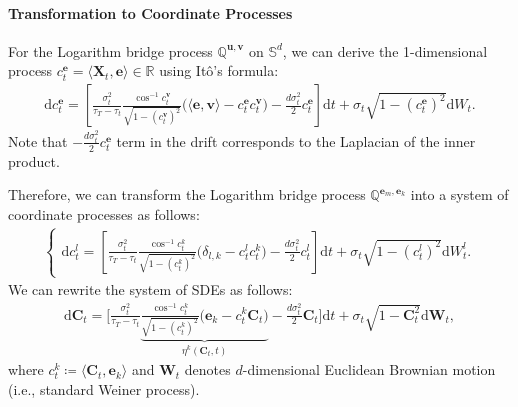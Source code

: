 \paragraph{Transformation to Coordinate Processes}
For the Logarithm bridge process $\mathbb{Q}^{\bm{u},\bm{v}}$ on $\mathbb{S}^d$, we can derive the 1-dimensional process $c^{\bm{e}}_t = \langle\bm{X}_t, \bm{e}\rangle\in\mathbb{R}$ using It\^{o}'s formula:
\begin{align}
    \mathrm{d}c^{\bm{e}}_t = \left[ 
        \frac{\sigma_t^2}{\tau_T - \tau_t} \frac{\cos^{-1}c^{\bm{v}}_t}{\sqrt{1 - (c^{\bm{v}}_t)^2}} \bigg( \langle\bm{e}, \bm{v}\rangle - c^{\bm{e}}_t c^{\bm{v}}_t \bigg) 
        -\frac{d\sigma_t^2}{2}c^{\bm{e}}_t 
    \right]\mathrm{d}t + \sigma_t\sqrt{1 - (c^{\bm{e}}_t)^2}\mathrm{d}W_t.
\label{eq:coord_process}
\end{align}
Note that $-\frac{d\sigma_t^2}{2}c^{\bm{e}}_t$ term in the drift corresponds to the Laplacian of the inner product.

Therefore, we can transform the Logarithm bridge process $\mathbb{Q}^{\bm{e}_m,\bm{e}_k}$ into a system of coordinate processes as follows:
\begin{align}
\begin{cases}
    \mathrm{d}c^l_t = \left[ \frac{\sigma_t^2}{\tau_T - \tau_t}
        \frac{\cos^{-1}c^{k}_t}{\sqrt{1 - (c^{k}_t)^2}} \bigg( \delta_{l,k} - c^{l}_t c^{k}_t \bigg) -\frac{d\sigma_t^2}{2}c^{l}_t 
    \right]\mathrm{d}t + \sigma_t\sqrt{1 - (c^{l}_t)^2}\mathrm{d}W^l_t.
\end{cases}
\end{align}
We can rewrite the system of SDEs as follows:
\begin{align}
    \mathrm{d}\bm{C}_t = \Bigg[ 
        \frac{\sigma_t^2}{\tau_T - \tau_t} \underbrace{\frac{\cos^{-1}c^k_t}{\sqrt{1 - (c^k_t)^2}} \Big( \bm{e}_k - c^k_t\bm{C}_t \Big)}_{\eta^{k}(\bm{C}_t,t)} - \frac{d\sigma_t^2}{2}\bm{C}_t
    \Bigg]\mathrm{d}t + \sigma_t\sqrt{1 - \bm{C}_t^2}\mathrm{d}\bm{W}_t,
\end{align}
where $c^k_t\coloneqq \langle \bm{C}_t,\bm{e}_k \rangle$ and $\bm{W}_t$ denotes $d$-dimensional Euclidean Brownian motion (i.e., standard Weiner process).

